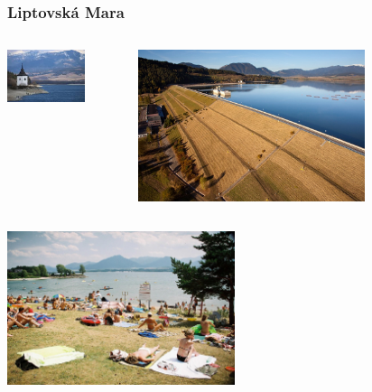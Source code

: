 \documentclass{beamer}
\begin{document}
	\begin{frame}
		\frametitle{Liptovská Mara}

		\begin{columns}	
		\begin{column}{0.5\textwidth}
		\centering
		\includegraphics[width=0.7\textwidth]{day4/mara}
		\end{column}
		\begin{column}{0.5\textwidth}
		\centering
		\includegraphics[width=0.7\textwidth]{day4/mara2}
		\end{column}
		\end{columns}
		\vspace{1em}
		\centering
		\includegraphics[width=0.5\textwidth]{day4/plaz}
	\end{frame}
\end{document}
